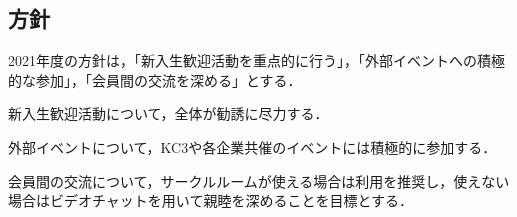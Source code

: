 \subsection*{\newGradeIfKouki{}\secondGrade{}方針}


2021年度の\newGradeIfKouki{}\secondGrade{}方針は，「新入生歓迎活動を重点的に行う」，「外部イベントへの積極的な参加」，「会員間の交流を深める」とする．

新入生歓迎活動について，\secondGrade{}全体が勧誘に尽力する．

外部イベントについて，KC3や各企業共催のイベントには積極的に参加する．

会員間の交流について，サークルルームが使える場合は利用を推奨し，使えない場合はビデオチャットを用いて親睦を深めることを目標とする．
